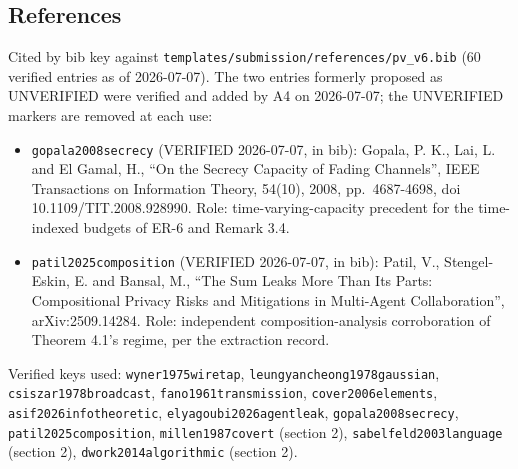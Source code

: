 \documentclass[
  11pt,
]{article}
\providecommand{\tightlist}{%
  \setlength{\itemsep}{0pt}\setlength{\parskip}{0pt}}
\begin{document}
\subsection{References}\label{references}

Cited by bib key against
\texttt{templates/submission/references/pv\_v6.bib} (60 verified entries
as of 2026-07-07). The two entries formerly proposed as UNVERIFIED were
verified and added by A4 on 2026-07-07; the UNVERIFIED markers are
removed at each use:

\begin{itemize}
\tightlist
\item
  \texttt{gopala2008secrecy} (VERIFIED 2026-07-07, in bib): Gopala, P.
  K., Lai, L. and El Gamal, H., ``On the Secrecy Capacity of Fading
  Channels'', IEEE Transactions on Information Theory, 54(10), 2008,
  pp.~4687-4698, doi 10.1109/TIT.2008.928990. Role:
  time-varying-capacity precedent for the time-indexed budgets of ER-6
  and Remark 3.4.
\item
  \texttt{patil2025composition} (VERIFIED 2026-07-07, in bib): Patil,
  V., Stengel-Eskin, E. and Bansal, M., ``The Sum Leaks More Than Its
  Parts: Compositional Privacy Risks and Mitigations in Multi-Agent
  Collaboration'', arXiv:2509.14284. Role: independent
  composition-analysis corroboration of Theorem 4.1's regime, per the
  extraction record.
\end{itemize}

Verified keys used: \texttt{wyner1975wiretap},
\texttt{leungyancheong1978gaussian}, \texttt{csiszar1978broadcast},
\texttt{fano1961transmission}, \texttt{cover2006elements},
\texttt{asif2026infotheoretic}, \texttt{elyagoubi2026agentleak},
\texttt{gopala2008secrecy}, \texttt{patil2025composition},
\texttt{millen1987covert} (section 2), \texttt{sabelfeld2003language}
(section 2), \texttt{dwork2014algorithmic} (section 2).
\end{document}
